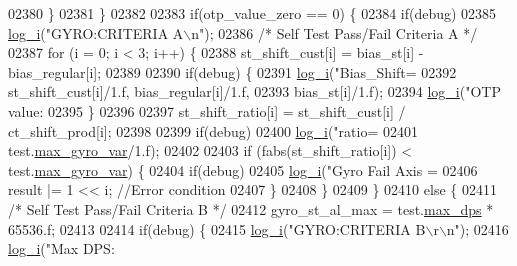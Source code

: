 \begin{DoxyCode}
{{{{{{{{{{{{{{{{{{{02380         \}
02381     \}
02382 
02383     \textcolor{keywordflow}{if}(otp\_value\_zero == 0) \{
02384         \textcolor{keywordflow}{if}(debug)
02385             \hyperlink{inv__mpu_8c_a67fc07fa528d8e62dc7b88a847b563f5}{log\_i}(\textcolor{stringliteral}{"GYRO:CRITERIA A\(\backslash\)n"});
02386         \textcolor{comment}{/* Self Test Pass/Fail Criteria A */}
02387         \textcolor{keywordflow}{for} (i = 0; i < 3; i++) \{
02388             st\_shift\_cust[i] = bias\_st[i] - bias\_regular[i];
02389 
02390             \textcolor{keywordflow}{if}(debug) \{
02391                 \hyperlink{inv__mpu_8c_a67fc07fa528d8e62dc7b88a847b563f5}{log\_i}(\textcolor{stringliteral}{"Bias\_Shift=%
02392                         st\_shift\_cust[i]/1.f, bias\_regular[i]/1.f,
02393                         bias\_st[i]/1.f);
02394                 \hyperlink{inv__mpu_8c_a67fc07fa528d8e62dc7b88a847b563f5}{log\_i}(\textcolor{stringliteral}{"OTP value: %
02395             \}
02396 
02397             st\_shift\_ratio[i] = st\_shift\_cust[i] / ct\_shift\_prod[i];
02398 
02399             \textcolor{keywordflow}{if}(debug)
02400                 \hyperlink{inv__mpu_8c_a67fc07fa528d8e62dc7b88a847b563f5}{log\_i}(\textcolor{stringliteral}{"ratio=%
02401                             test.\hyperlink{structtest__s_a629a75454f5af8caaff2fe8388975d32}{max\_gyro\_var}/1.f);
02402 
02403             \textcolor{keywordflow}{if} (fabs(st\_shift\_ratio[i]) < test.\hyperlink{structtest__s_a629a75454f5af8caaff2fe8388975d32}{max\_gyro\_var}) \{
02404                 \textcolor{keywordflow}{if}(debug)
02405                     \hyperlink{inv__mpu_8c_a67fc07fa528d8e62dc7b88a847b563f5}{log\_i}(\textcolor{stringliteral}{"Gyro Fail Axis = %
02406                 result |= 1 << i;   \textcolor{comment}{//Error condition}
02407             \}
02408         \}
02409     \}
02410     \textcolor{keywordflow}{else} \{
02411         \textcolor{comment}{/* Self Test Pass/Fail Criteria B */}
02412         gyro\_st\_al\_max = test.\hyperlink{structtest__s_a9085b0647fbd57e7ed8e0c4371ad1de2}{max\_dps} * 65536.f;
02413 
02414         \textcolor{keywordflow}{if}(debug) \{
02415             \hyperlink{inv__mpu_8c_a67fc07fa528d8e62dc7b88a847b563f5}{log\_i}(\textcolor{stringliteral}{"GYRO:CRITERIA B\(\backslash\)r\(\backslash\)n"});
02416             \hyperlink{inv__mpu_8c_a67fc07fa528d8e62dc7b88a847b563f5}{log\_i}(\textcolor{stringliteral}{"Max DPS: %
}}}}}}}}}}}}}}}}}}}}}}}}
\end{DoxyCode}
